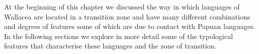 At the beginning of this chapter we discussed the way in which languages
of Wallacea are located in a transition zone and
have many different combinations and degrees of features
some of which are due to contact with Papuan languages.
In the following sections we explore in more detail some
of the typological features that characterise these
languages and the zone of transition.
